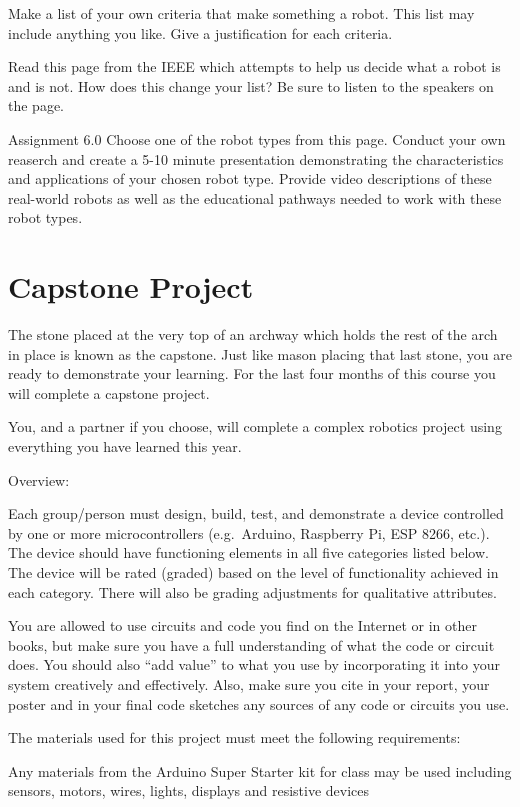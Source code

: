\documentclass[
]{book}
\begin{document}
Make a list of your own criteria that make something a robot. This list may include anything you like. Give a justification for each criteria.

Read this page from the IEEE which attempts to help us decide what a robot is and is not. How does this change your list? Be sure to listen to the speakers on the page.

Assignment 6.0
Choose one of the robot types from this page. Conduct your own reaserch and create a 5-10 minute presentation demonstrating the characteristics and applications of your chosen robot type. Provide video descriptions of these real-world robots as well as the educational pathways needed to work with these robot types.

\hypertarget{capstone-project}{%
\chapter{Capstone Project}\label{capstone-project}}

The stone placed at the very top of an archway which holds the rest of the arch in place is known as the capstone. Just like mason placing that last stone, you are ready to demonstrate your learning. For the last four months of this course you will complete a capstone project.

You, and a partner if you choose, will complete a complex robotics project using everything you have learned this year.

Overview:

Each group/person must design, build, test, and demonstrate a device controlled by one or more microcontrollers (e.g.~Arduino, Raspberry Pi, ESP 8266, etc.). The device should have functioning elements in all five categories listed below. The device will be rated (graded) based on the level of functionality achieved in each category. There will also be grading adjustments for qualitative attributes.

You are allowed to use circuits and code you find on the Internet or in other books, but make sure you have a full understanding of what the code or circuit does. You should also ``add value'' to what you use by incorporating it into your system creatively and effectively. Also, make sure you cite in your report, your poster and in your final code sketches any sources of any code or circuits you use.

The materials used for this project must meet the following requirements:

Any materials from the Arduino Super Starter kit for class may be used including sensors, motors, wires, lights, displays and resistive devices
\end{document}

